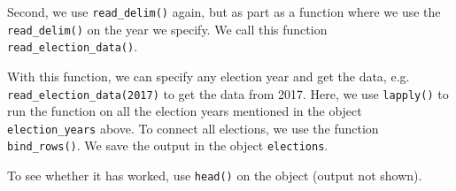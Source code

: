 \documentclass[12pt,oneside]{reedthesis}
\theoremstyle{definition}
\theoremstyle{definition}
\theoremstyle{definition}
\theoremstyle{remark}
\begin{document}
  \begin{Shaded}
  \begin{Highlighting}[]
  \StringTok{ }\NormalTok{(}\NormalTok{, }\NormalTok{, }\NormalTok{, }\NormalTok{, }\NormalTok{, }\NormalTok{,}
  \NormalTok{, }\NormalTok{, }\NormalTok{, }\NormalTok{, }\NormalTok{, }\NormalTok{,}
  \NormalTok{, }\NormalTok{, }\NormalTok{, }\NormalTok{, }\NormalTok{)}
  \end{Highlighting}
  \end{Shaded}
  Second, we use \texttt{read\_delim()} again, but as part as a function
  where we use the \texttt{read\_delim()} on the year we specify. We call
  this function \texttt{read\_election\_data()}.
  \begin{Shaded}
  \end{Shaded}
  With this function, we can specify any election year and get the data,
  e.g. \texttt{read\_election\_data(2017)} to get the data from 2017.
  Here, we use \texttt{lapply()} to run the function on all the election
  years mentioned in the object \texttt{election\_years} above. To connect
  all elections, we use the function \texttt{bind\_rows()}. We save the
  output in the object \texttt{elections}.
  \begin{Shaded}
  \begin{Highlighting}[]
  \StringTok{ }\NormalTok{(}
  \end{Highlighting}
  \end{Shaded}
  To see whether it has worked, use \texttt{head()} on the object (output
  not shown).
  \begin{Shaded}
  \begin{Highlighting}[]
  \end{Highlighting}
  \end{Shaded}
\end{document}
